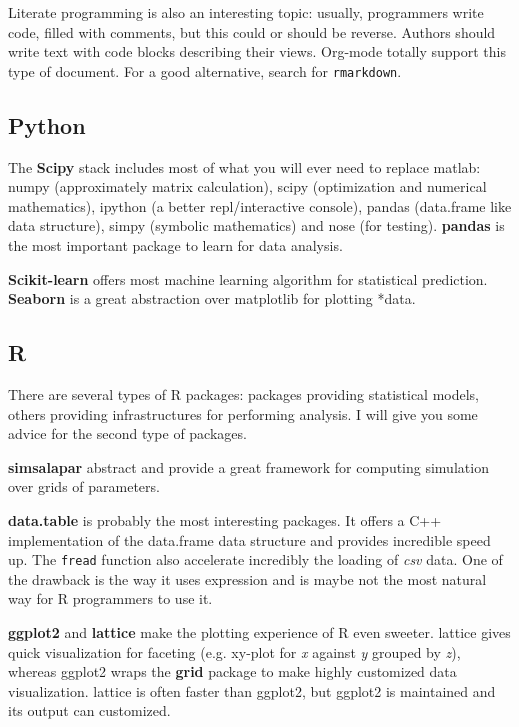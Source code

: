 \documentclass[11pt]{article}
\begin{document}
Literate programming is also an interesting topic: usually, programmers
write code, filled with comments, but this could or should be
reverse. Authors should write text with code blocks describing their
views. Org-mode totally support this type of document. For a good
alternative, search for \texttt{rmarkdown}.

\subsection{Python}
\label{sec:orgad0ab13}
The \textbf{Scipy} stack includes most of what you will ever need to replace
matlab: numpy (approximately matrix calculation), scipy (optimization and
numerical mathematics), ipython (a better repl/interactive console), pandas
(data.frame like data structure), simpy (symbolic mathematics) and nose (for
testing). \textbf{pandas} is the most important package to learn for data analysis.

\textbf{Scikit-learn} offers most machine learning algorithm for statistical
prediction. \textbf{Seaborn} is a great abstraction over matplotlib for plotting
*data.

\subsection{R}
\label{sec:orga4ad457}
There are several types of R packages: packages providing statistical
models, others providing infrastructures for performing analysis. I will
give you some advice for the second type of packages.

\textbf{simsalapar} abstract and provide a great framework for computing simulation
over grids of parameters.

\textbf{data.table} is probably the most interesting packages. It offers a C++
implementation of the data.frame data structure and provides incredible
speed up. The \texttt{fread} function also accelerate incredibly the loading of
\emph{csv} data. One of the drawback is the way it uses expression and is maybe
not the most natural way for R programmers to use it.

\textbf{ggplot2} and \textbf{lattice} make the plotting experience of R even
sweeter. lattice gives quick visualization for faceting (e.g. xy-plot for
\emph{x} against \emph{y} grouped by \emph{z}), whereas ggplot2 wraps the \textbf{grid} package to
make highly customized data visualization. lattice is often faster than
ggplot2, but ggplot2 is maintained and its output can customized.
\end{document}

